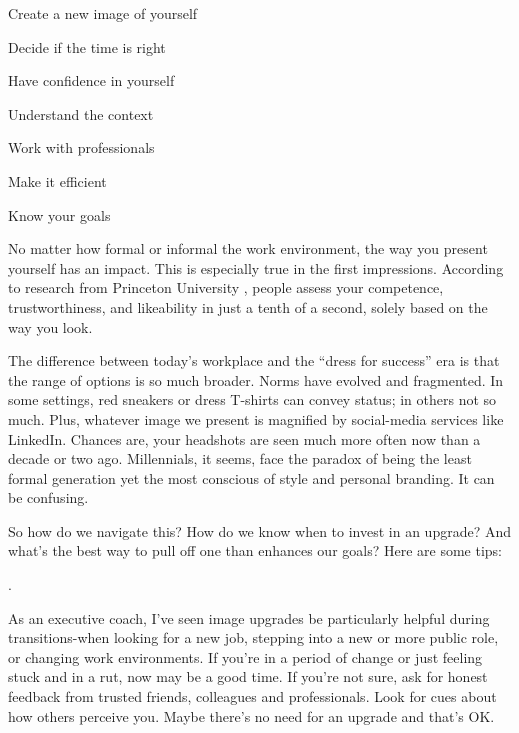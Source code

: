 \begin{listmatch}
	\item
Create a new image of yourself


\item 
 Decide if the time is right


\item 
 Have confidence in yourself


\item 
 Understand the context


\item 
 Work with professionals


\item 
 Make it efficient


\item 
 Know your goals
\end{listmatch}

No matter how formal or informal the work environment, the way you
present yourself has an impact. This is especially true in the first
impressions. According to research from Princeton University , people
assess your competence, trustworthiness, and likeability in just a
tenth of a second, solely based on the way you look.

The difference between today's workplace and the ``dress for
success'' era is that the range of options is so much broader. Norms
have evolved and fragmented. In some settings, red sneakers or dress
T-shirts can convey status; in others not so much. Plus, whatever
image we present is magnified by social-media services like LinkedIn.
Chances are, your headshots are seen much more often now than a decade
or two ago. Millennials, it seems, face the paradox of being the
least formal generation yet the most conscious of style and personal
branding. It can be confusing.

So how do we navigate this? How do we know when to invest in an
upgrade? And what's the best way to pull off one than enhances our
goals? Here are some tips:

\linefill.

As an executive coach, I've seen image upgrades be particularly
helpful during transitions-when looking for a new job, stepping into a
new or more public role, or changing work environments. If you're in a
period of change or just feeling stuck and in a rut, now may be a good
time. If you're not sure, ask for honest feedback from trusted
friends, colleagues and professionals. Look for cues about how others
perceive you. Maybe there's no need for an upgrade and that's OK.

